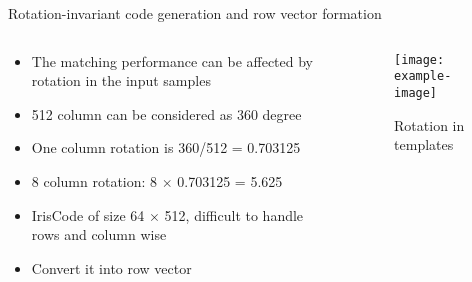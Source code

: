 \documentclass{beamer}
\begin{document}
\begin{frame}{Rotation-invariant code generation and row vector formation}
    \begin{columns}[T]
        \begin{column}{.5\textwidth}
                \begin{itemize}
                    \item The matching performance can be affected by rotation in the input samples 
                    \item 512 column can be considered as 360 degree \cite{encode}
                    \item One column rotation is 360/512 = 0.703125 
                    \item 8 column rotation: 8 $\times$ 0.703125 = 5.625
                    \item IrisCode of size 64 $\times$ 512, difficult to handle rows and column wise 
                    \item Convert it into row vector
                \end{itemize}
        \end{column}
        \begin{column}{.5\textwidth}
                \begin{figure}
                    \centering
                    \texttt{[image: example-image]}
                    \caption{Rotation in templates}
                \end{figure}%
        \end{column}
    \end{columns}
\end{frame}
\end{document}
